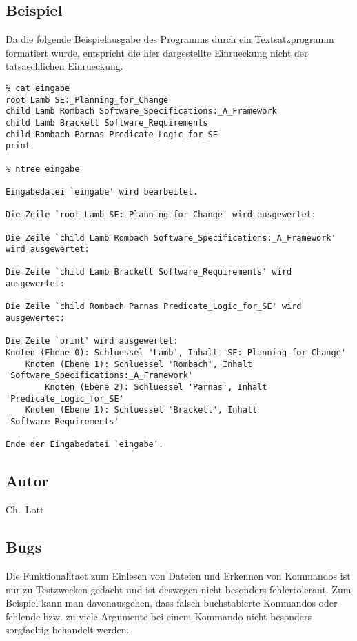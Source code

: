 \subsection*{Beispiel}
Da die folgende Beispielausgabe des Programms durch ein Textsatzprogramm 
formatiert wurde, entspricht die hier dargestellte Einrueckung nicht der
tatsaechlichen Einrueckung. 

{\small
\begin{verbatim}
% cat eingabe
root Lamb SE:_Planning_for_Change
child Lamb Rombach Software_Specifications:_A_Framework
child Lamb Brackett Software_Requirements
child Rombach Parnas Predicate_Logic_for_SE
print

% ntree eingabe

Eingabedatei `eingabe' wird bearbeitet.

Die Zeile `root Lamb SE:_Planning_for_Change' wird ausgewertet:

Die Zeile `child Lamb Rombach Software_Specifications:_A_Framework' wird ausgewertet:

Die Zeile `child Lamb Brackett Software_Requirements' wird ausgewertet:

Die Zeile `child Rombach Parnas Predicate_Logic_for_SE' wird ausgewertet:

Die Zeile `print' wird ausgewertet:
Knoten (Ebene 0): Schluessel 'Lamb', Inhalt 'SE:_Planning_for_Change'
    Knoten (Ebene 1): Schluessel 'Rombach', Inhalt 'Software_Specifications:_A_Framework'
        Knoten (Ebene 2): Schluessel 'Parnas', Inhalt 'Predicate_Logic_for_SE'
    Knoten (Ebene 1): Schluessel 'Brackett', Inhalt 'Software_Requirements'

Ende der Eingabedatei `eingabe'.
\end{verbatim}
} %

\subsection*{Autor}

Ch.\ Lott

\subsection*{Bugs}

Die Funktionalitaet zum Einlesen von Dateien und Erkennen von
Kommandos ist nur zu Testzwecken gedacht und ist deswegen nicht
besonders fehlertolerant.  Zum Beispiel kann man davonausgehen, 
dass falsch buchstabierte Kommandos oder fehlende bzw. zu
viele Argumente bei einem Kommando nicht besonders sorgfaeltig
behandelt werden. 
